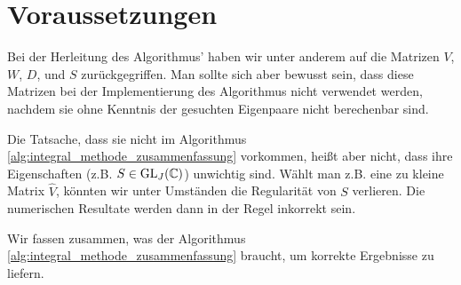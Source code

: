 \section{Voraussetzungen}

Bei der Herleitung des Algorithmus' haben wir unter anderem auf die Matrizen
$V$, $W$, $D$, und $S$ zurückgegriffen. Man sollte sich aber bewusst sein, dass
diese Matrizen bei der Implementierung des Algorithmus nicht verwendet werden,
nachdem sie ohne Kenntnis der gesuchten Eigenpaare nicht berechenbar sind.

Die Tatsache, dass sie nicht im Algorithmus \ref{alg:integral_methode_zusammenfassung} vorkommen, heißt aber nicht, dass ihre Eigenschaften (z.B. $S \in \operatorname{GL}_J(\mathbb{C})$) unwichtig sind.
Wählt man z.B. eine zu kleine Matrix $\hat V$, könnten wir unter Umständen
die Regularität von $S$ verlieren.
Die numerischen Resultate werden dann in der Regel inkorrekt sein.

Wir fassen zusammen, was der Algorithmus \ref{alg:integral_methode_zusammenfassung} braucht, um korrekte Ergebnisse zu liefern.

